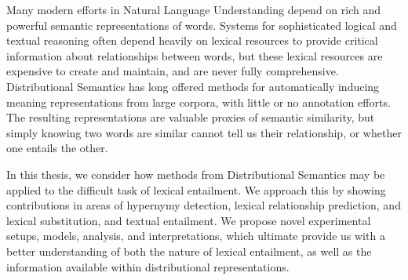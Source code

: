 Many modern efforts in Natural Language Understanding depend on rich and
powerful semantic representations of words. Systems for sophisticated logical
and textual reasoning often depend heavily on
lexical resources to provide critical information about relationships
between words, but these lexical resources are expensive to create and
maintain, and are never fully comprehensive. Distributional Semantics has
long offered methods for automatically inducing meaning representations from
large corpora, with little or no annotation efforts. The resulting
representations are valuable proxies of semantic similarity, but simply knowing
two words are similar cannot tell us their relationship, or whether one
entails the other.

In this thesis, we consider how methods from Distributional Semantics may be
applied to the difficult task of lexical entailment. We approach this by
showing contributions in areas of hypernymy detection, lexical relationship
prediction, and lexical substitution, and textual entailment. We propose novel
experimental setups, models, analysis, and interpretations, which ultimate
provide us with a better understanding of both the nature of lexical entailment,
as well as the information available within distributional representations.


